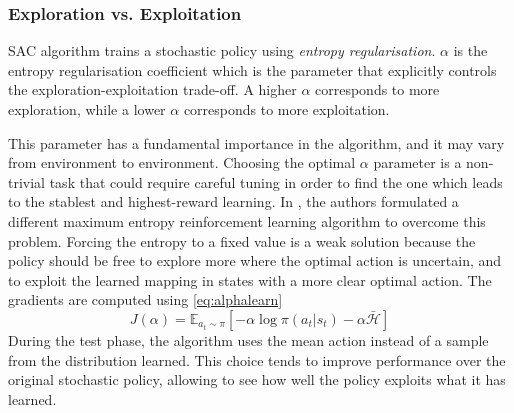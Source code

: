 \subsubsection{Exploration vs. Exploitation} \label{alphasac}
SAC algorithm trains a stochastic policy using \textit{entropy regularisation}.
$\alpha$ is the entropy regularisation coefficient which is the parameter that explicitly controls the exploration-exploitation trade-off.
A higher $\alpha$ corresponds to more exploration, while a lower $\alpha$ corresponds to more exploitation.

This parameter has a fundamental importance in the algorithm, and it may vary from environment to environment.
Choosing the optimal $\alpha$ parameter is a non-trivial task that could require careful tuning in order to find the one which leads to the stablest and highest-reward learning.
In \cite[Section 5]{haarnoja2018alg}, the authors formulated a different maximum entropy reinforcement learning algorithm to overcome this problem.
Forcing the entropy to a fixed value is a weak solution because the policy should be free to explore more where the optimal action is uncertain, and to exploit the learned mapping in states with a more clear optimal action.
The gradients are computed using \vref{eq:alphalearn}
\begin{equation} \label{eq:alphalearn}
	J(\alpha) = \mathbb{E}_{a_t \sim \pi}[-\alpha \log\pi(a_t|s_t) - \alpha \bar{\mathcal{H}}]
\end{equation}
During the test phase, the algorithm uses the mean action instead of a  sample from the distribution learned.
This choice tends to improve performance over the original stochastic policy, allowing to see how well the policy exploits what it has learned.


